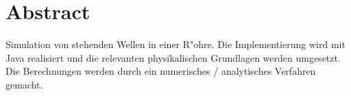 \chapter{Abstract}


Simulation von stehenden Wellen in einer R"ohre. Die Implementierung wird mit Java realisiert und die relevanten physikalischen Grundlagen werden umgesetzt. Die Berechnungen werden durch ein numerisches / analytisches Verfahren gemacht.
